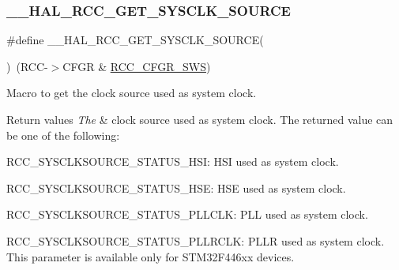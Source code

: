 \subsubsection{\texorpdfstring{\+\_\+\+\_\+\+H\+A\+L\+\_\+\+R\+C\+C\+\_\+\+G\+E\+T\+\_\+\+S\+Y\+S\+C\+L\+K\+\_\+\+S\+O\+U\+R\+CE}{\_\_HAL\_RCC\_GET\_SYSCLK\_SOURCE}}
{\footnotesize\ttfamily \#define \+\_\+\+\_\+\+H\+A\+L\+\_\+\+R\+C\+C\+\_\+\+G\+E\+T\+\_\+\+S\+Y\+S\+C\+L\+K\+\_\+\+S\+O\+U\+R\+CE(\begin{DoxyParamCaption}{ }\end{DoxyParamCaption})~(R\+CC-\/$>$C\+F\+GR \& \hyperlink{group___peripheral___registers___bits___definition_ga15bf2269500dc97e137315f44aa015c9}{R\+C\+C\+\_\+\+C\+F\+G\+R\+\_\+\+S\+WS})}



Macro to get the clock source used as system clock. 


\begin{DoxyRetVals}{Return values}
{\em The} & clock source used as system clock. The returned value can be one of the following\+:
\begin{DoxyItemize}
\item R\+C\+C\+\_\+\+S\+Y\+S\+C\+L\+K\+S\+O\+U\+R\+C\+E\+\_\+\+S\+T\+A\+T\+U\+S\+\_\+\+H\+SI\+: H\+SI used as system clock.
\item R\+C\+C\+\_\+\+S\+Y\+S\+C\+L\+K\+S\+O\+U\+R\+C\+E\+\_\+\+S\+T\+A\+T\+U\+S\+\_\+\+H\+SE\+: H\+SE used as system clock.
\item R\+C\+C\+\_\+\+S\+Y\+S\+C\+L\+K\+S\+O\+U\+R\+C\+E\+\_\+\+S\+T\+A\+T\+U\+S\+\_\+\+P\+L\+L\+C\+LK\+: P\+LL used as system clock.
\item R\+C\+C\+\_\+\+S\+Y\+S\+C\+L\+K\+S\+O\+U\+R\+C\+E\+\_\+\+S\+T\+A\+T\+U\+S\+\_\+\+P\+L\+L\+R\+C\+LK\+: P\+L\+LR used as system clock. This parameter is available only for S\+T\+M32\+F446xx devices. 
\end{DoxyItemize}\\
\hline
\end{DoxyRetVals}
\mbox{\label{group___r_c_c___get___clock__source_ga32f72b8c5b7e97b415867c57f9fafed6}} 
